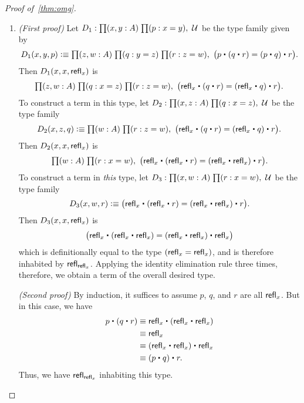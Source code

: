 \begin{proof}[Proof of~\autoref{thm:omg}]
\begin{enumerate}
    \noindent \emph{(Second proof)} By induction, it suffices to assume $p$ is $\refl x$.
    But in this case, we have $\opp{\opp{p}}\jdeq \opp{\opp{\refl x}} \jdeq \refl x$.
  \item \emph{(First proof)} Let $D_1:\prd{x,y:A}{p:x=y} \type$ be the type family given by
    \begin{equation*}
      D_1(x,y,p)\defeq\prd{z,w:A}{q:y= z}{r:z= w} \big(p\ct (q\ct r)=  (p\ct q)\ct r\big).
    \end{equation*}
    Then $D_1(x,x,\mathsf{refl}_{x})$ is
    \begin{equation*}
      \prd{z,w:A}{q:x= z}{r:z= w} \big(\refl{x}\ct(q\ct r)= (\refl{x}\ct q)\ct r\big).
    \end{equation*}
    To construct a term in this type, let $D_2:\prd{x,z:A}{q:x=z} \type$ be the type family
    \begin{equation*}
      D_2 (x,z,q) \defeq \prd{w:A}{r:z=w} \big(\refl{x}\ct(q\ct r)= (\refl{x}\ct q)\ct r\big).
    \end{equation*}
    Then $D_2(x,x,\mathsf{refl}_{x})$ is
    \begin{equation*}
      \prd{w:A}{r:x=w} \big(\refl{x}\ct(\refl{x}\ct r)= (\refl{x}\ct \refl{x})\ct r\big).
    \end{equation*}
    To construct a term in \emph{this} type, let $D_3:\prd{x,w:A}{r:x=w} \type$ be the type family
    \begin{equation*}
      D_3(x,w,r) \defeq \big(\refl{x}\ct(\refl{x}\ct r)= (\refl{x}\ct \refl{x})\ct r\big).
    \end{equation*}
    Then $D_3(x,x,\mathsf{refl}_{x})$ is
    \begin{equation*}
      \big(\refl{x}\ct(\refl{x}\ct \refl{x})= (\refl{x}\ct \refl{x})\ct \refl{x}\big)
    \end{equation*}
    which is definitionally equal to the type $(\mathsf{refl}_{x} = \mathsf{refl}_{x})$, and is therefore inhabited by $\mathsf{refl}_{\mathsf{refl}_{x}}$.
    Applying the identity elimination rule three times, therefore, we obtain a term of the overall desired type.

    \noindent \emph{(Second proof)} By induction, it suffices to assume $p$, $q$, and $r$ are all $\refl x$.
    But in this case, we have
    \begin{align*}
      p\ct (q\ct r)
      &\jdeq \refl{x}\ct(\refl{x}\ct \refl{x})\\
      &\jdeq \refl{x}\\
      &\jdeq (\refl{x}\ct \refl x)\ct \refl x\\
      &\jdeq (p\ct q)\ct r.
    \end{align*}
    Thus, we have $\mathsf{refl}_{\mathsf{refl}_{x}}$ inhabiting this type.\qedhere
  \end{enumerate}
\end{proof}

